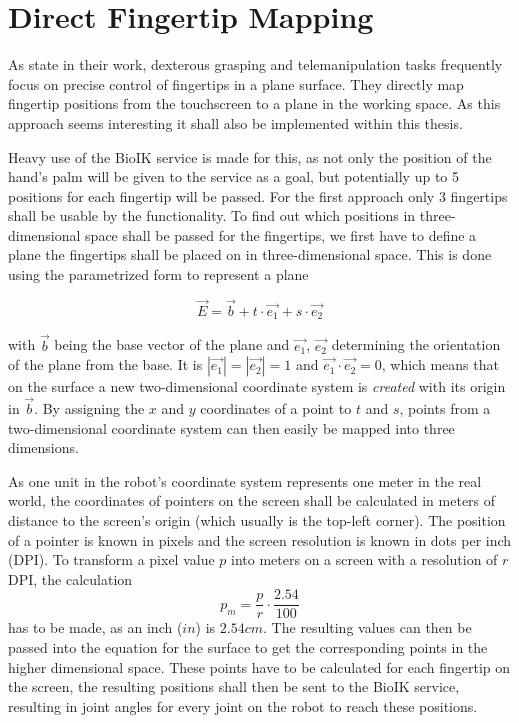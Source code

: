\section{Direct Fingertip Mapping}

As \citeauthor{conf:humanoids:TohHLBZP12} state in their work, dexterous grasping and telemanipulation tasks frequently focus on precise control of fingertips in a plane surface\cite{conf:humanoids:TohHLBZP12}. They directly map fingertip positions from the touchscreen to a plane in the working space. As this approach seems interesting it shall also be implemented within this thesis.

Heavy use of the BioIK service is made for this, as not only the position of the hand's palm will be given to the service as a goal, but potentially up to 5 positions for each fingertip will be passed. For the first approach only 3 fingertips shall be usable by the functionality. To find out which positions in three-dimensional space shall be passed for the fingertips, we first have to define a plane the fingertips shall be placed on in three-dimensional space. This is done using the parametrized form to represent a plane 

\begin{equation*}
\vec{E} = \vec{b} + t\cdot \vec{e_1} + s \cdot \vec{e_2}
\end{equation*}

with $\vec{b}$ being the base vector of the plane and $\vec{e_1}$, $\vec{e_2}$ determining the orientation of the plane from the base. It is $|\vec{e_1}| = |\vec{e_2}| = 1$ and $\vec{e_1} \cdot \vec{e_2} = 0$, which means that on the surface a new two-dimensional coordinate system is \textit{created} with its origin in $\vec{b}$. By assigning the $x$ and $y$ coordinates of a point to $t$ and $s$, points from a two-dimensional coordinate system can then easily be mapped into three dimensions.

As one unit in the robot's coordinate system represents one meter in the real world, the coordinates of pointers on the screen shall be calculated in meters of distance to the screen's origin (which usually is the top-left corner). The position of a pointer is known in pixels and the screen resolution is known in dots per inch (DPI). To transform a pixel value $p$ into meters on a screen with a resolution of $r$ DPI, the calculation
\begin{equation*}
p_m = \frac{p}{r} \cdot \frac{2.54}{100}
\end{equation*}
has to be made, as an inch ($in$) is $2.54cm$. The resulting values can then be passed into the equation for the surface to get the corresponding points in the higher dimensional space. These points have to be calculated for each fingertip on the screen, the resulting positions shall then be sent to the BioIK service, resulting in joint angles for every joint on the robot to reach these positions.

